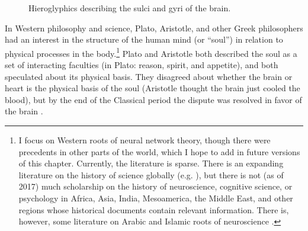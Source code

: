 \begin{figure}[h]
\centering
{}
\caption[From ]{Hieroglyphics describing the sulci and gyri of the brain.}
\label{papyrus}
\end{figure}

In Western philosophy and science, Plato, Aristotle, and other Greek philosophers had an interest in the structure of the human mind (or ``soul'') in relation to physical processes in the body.\footnote{I focus on Western roots of neural network theory, though there were precedents in other parts of the world, which I hope to add in future versions of this chapter. Currently, the literature is sparse. There is an expanding literature on the history of science globally (e.g. \cite{selin2013encyclopaedia}), but there is not (as of 2017) much scholarship on the history of neuroscience, cognitive science, or psychology in Africa, Asia, India, Mesoamerica, the Middle East, and other regions whose historical documents contain relevant information. There is, however, some literature on  Arabic and Islamic roots of neuroscience \cite{mohamed2008arab}.}  Plato and Aristotle both described the soul as a set of interacting faculties (in Plato: reason, spirit, and appetite), and both speculated about its physical basis. They disagreed  about whether the brain or heart is the physical basis of the soul (Aristotle thought the brain just cooled the blood), but by the end of the Classical period the dispute was resolved in favor of the brain \cite{finger2001origins}.

